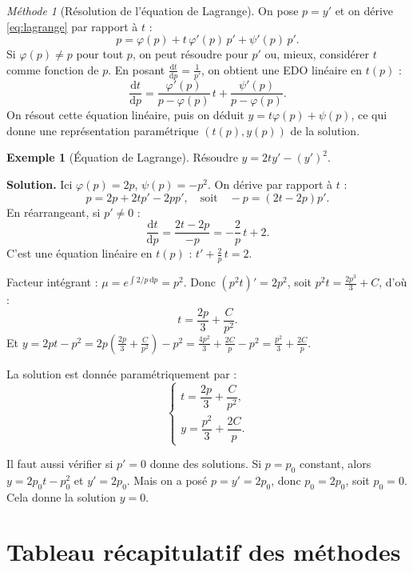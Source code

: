 \documentclass[12pt,a4paper,openany]{book}
\theoremstyle{definition}
\newtheorem{exemple}[definition]{Exemple}
\theoremstyle{plain}
\theoremstyle{remark}
\newtheorem{methode}[definition]{Méthode}
\newcommand{\dd}{\mathrm{d}}
\begin{document}
\begin{methode}[Résolution de l'équation de Lagrange]
\label{meth:lagrange}
On pose $p = y'$ et on dérive \eqref{eq:lagrange} par rapport à $t$ :
\[
p = \varphi(p) + t\,\varphi'(p)\,p' + \psi'(p)\,p'.
\]
Si $\varphi(p) \neq p$ pour tout $p$, on peut résoudre pour $p'$ ou, mieux, considérer $t$ comme fonction de $p$. En posant $\frac{\dd t}{\dd p} = \frac{1}{p'}$, on obtient une EDO linéaire en $t(p)$ :
\[
\frac{\dd t}{\dd p} = \frac{\varphi'(p)}{p - \varphi(p)}\,t + \frac{\psi'(p)}{p - \varphi(p)}.
\]
On résout cette équation linéaire, puis on déduit $y = t\varphi(p) + \psi(p)$, ce qui donne une représentation paramétrique $(t(p), y(p))$ de la solution.
\end{methode}

\begin{exemple}[Équation de Lagrange]
\label{ex:lagrange}
Résoudre $y = 2ty' - (y')^2$.

\textbf{Solution.} Ici $\varphi(p) = 2p$, $\psi(p) = -p^2$. On dérive par rapport à $t$ :
\[
p = 2p + 2tp' - 2pp', \quad \text{soit} \quad -p = (2t - 2p)p'.
\]
En réarrangeant, si $p' \neq 0$ :
\[
\frac{\dd t}{\dd p} = \frac{2t - 2p}{-p} = -\frac{2}{p}\,t + 2.
\]
C'est une équation linéaire en $t(p)$ : $t' + \frac{2}{p}\,t = 2$.

Facteur intégrant : $\mu = e^{\int 2/p\,\dd p} = p^2$. Donc $(p^2 t)' = 2p^2$, soit $p^2 t = \frac{2p^3}{3} + C$, d'où :
\[
t = \frac{2p}{3} + \frac{C}{p^2}.
\]
Et $y = 2pt - p^2 = 2p\!\left(\frac{2p}{3} + \frac{C}{p^2}\right) - p^2 = \frac{4p^2}{3} + \frac{2C}{p} - p^2 = \frac{p^2}{3} + \frac{2C}{p}$.

La solution est donnée paramétriquement par :
\[
\boxed{\begin{cases} t = \dfrac{2p}{3} + \dfrac{C}{p^2},\\[8pt] y = \dfrac{p^2}{3} + \dfrac{2C}{p}. \end{cases}}
\]

Il faut aussi vérifier si $p' = 0$ donne des solutions. Si $p = p_0$ constant, alors $y = 2p_0 t - p_0^2$ et $y' = 2p_0$. Mais on a posé $p = y' = 2p_0$, donc $p_0 = 2p_0$, soit $p_0 = 0$. Cela donne la solution $y = 0$.
\end{exemple}

\section{Tableau récapitulatif des méthodes}
\label{sec:tableau-recapitulatif}
\end{document}
